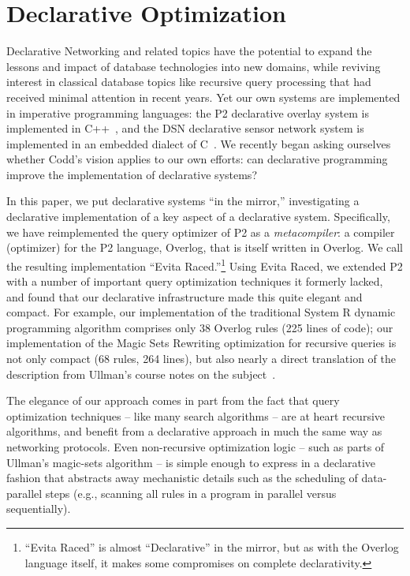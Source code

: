 \chapter[Declarative Optimization]{Declarative Optimization}
\label{ch:do}

Declarative Networking and related topics have the potential to expand the lessons and 
impact of database technologies into new domains, while reviving interest in classical 
database topics like recursive query processing that had received minimal attention in 
recent years.  Yet our own systems are implemented in imperative programming
languages: the P2 declarative overlay  system is implemented in C++~\cite{p2:sosp}, 
and the DSN declarative sensor network system is implemented in an embedded dialect 
of C~\cite{chu-sensys07}. We recently began asking ourselves whether Codd's vision
applies to our own efforts: can declarative programming improve the implementation
of declarative systems?

In this paper, we put declarative systems ``in the mirror,''
investigating a declarative implementation of a key aspect of a
declarative system.  Specifically, we have reimplemented the query
optimizer of P2 as a {\em metacompiler}: a compiler (optimizer) for the
P2 language, Overlog, that is itself written in Overlog.  We call the
resulting implementation ``Evita Raced.''\footnote{``Evita Raced'' is
almost ``Declarative'' in the mirror, but as with the Overlog language
itself, it makes some compromises on complete declarativity.}  Using
Evita Raced, we extended P2 with a number of important query
optimization techniques it formerly lacked, and found that our
declarative infrastructure made this quite elegant and compact. For
example, our implementation of the traditional System R dynamic
programming algorithm comprises only 38 Overlog rules (225 lines of
code); our implementation of the Magic Sets Rewriting optimization for
recursive queries is not only compact (68 rules, 264 lines), but also
nearly a direct translation of the description from Ullman's course
notes on the subject~\cite{ullmanNotes}.   

The elegance of our approach comes in part from the fact that query optimization 
techniques -- like many search algorithms -- are at heart recursive algorithms, and
benefit from a declarative approach in much the same way as networking
protocols.  Even non-recursive optimization logic -- such as parts of
Ullman's magic-sets algorithm -- is simple enough to express in a
declarative fashion that abstracts away mechanistic details such as the
scheduling of data-parallel steps (e.g., scanning all rules in a program
in parallel versus sequentially).

